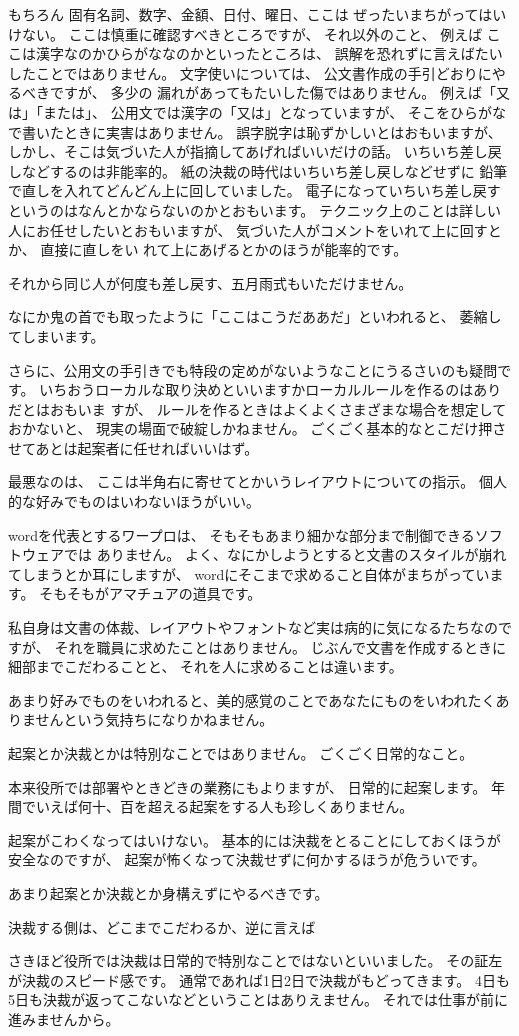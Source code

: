 \documentclass[uplatex,jis2004,dvipdfmx,12pt]{jsarticle}
\begin{document}
もちろん
固有名詞、数字、金額、日付、曜日、ここは
ぜったいまちがってはいけない。
ここは慎重に確認すべきところですが、
それ以外のこと、
例えば
ここは漢字なのかひらがななのかといったところは、
誤解を恐れずに言えばたいしたことではありません。
文字使いについては、
公文書作成の手引どおりにやるべきですが、
多少の
漏れがあってもたいした傷ではありません。
例えば「又は」「または」、
公用文では漢字の「又は」となっていますが、
そこをひらがなで書いたときに実害はありません。
誤字脱字は恥ずかしいとはおもいますが、
しかし、そこは気づいた人が指摘してあげればいいだけの話。
いちいち差し戻しなどするのは非能率的。
紙の決裁の時代はいちいち差し戻しなどせずに
鉛筆で直しを入れてどんどん上に回していました。
電子になっていちいち差し戻すというのはなんとかならないのかとおもいます。
テクニック上のことは詳しい人にお任せしたいとおもいますが、
気づいた人がコメントをいれて上に回すとか、
直接に直しをい
れて上にあげるとかのほうが能率的です。

それから同じ人が何度も差し戻す、五月雨式もいただけません。

なにか鬼の首でも取ったように「ここはこうだああだ」といわれると、
萎縮してしまいます。

さらに、公用文の手引きでも特段の定めがないようなことにうるさいのも疑問で
す。
いちおうローカルな取り決めといいますかローカルルールを作るのはありだとはおもいま
すが、
ルールを作るときはよくよくさまざまな場合を想定しておかないと、
現実の場面で破綻しかねません。
ごくごく基本的なとこだけ押させてあとは起案者に任せればいいはず。

最悪なのは、
ここは半角右に寄せてとかいうレイアウトについての指示。
個人的な好みでものはいわないほうがいい。


wordを代表とするワープロは、
そもそもあまり細かな部分まで制御できるソフトウェアでは
ありません。
よく、なにかしようとすると文書のスタイルが崩れてしまうとか耳にしますが、
wordにそこまで求めること自体がまちがっています。
そもそもがアマチュアの道具です。


私自身は文書の体裁、レイアウトやフォントなど実は病的に気になるたちなのですが、
それを職員に求めたことはありません。
じぶんで文書を作成するときに細部までこだわることと、
それを人に求めることは違います。

あまり好みでものをいわれると、美的感覚のことであなたにものをいわれたくあ
りませんという気持ちになりかねません。


起案とか決裁とかは特別なことではありません。
ごくごく日常的なこと。

本来役所では部署やときどきの業務にもよりますが、
日常的に起案します。
年間でいえば何十、百を超える起案をする人も珍しくありません。

起案がこわくなってはいけない。
基本的には決裁をとることにしておくほうが安全なのですが、
起案が怖くなって決裁せずに何かするほうが危ういです。

あまり起案とか決裁とか身構えずにやるべきです。

決裁する側は、どこまでこだわるか、逆に言えば


さきほど役所では決裁は日常的で特別なことではないといいました。
その証左が決裁のスピード感です。
通常であれば1日2日で決裁がもどってきます。
4日も5日も決裁が返ってこないなどということはありえません。
それでは仕事が前に進みませんから。
\end{document}
